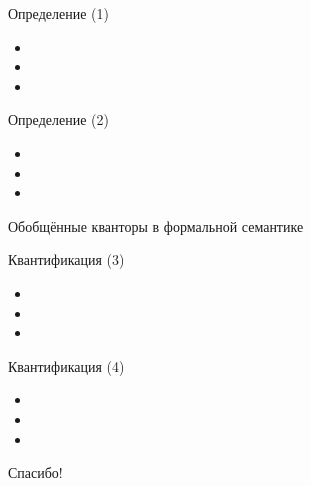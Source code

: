 \documentclass{beamer}
\begin{document}
\begin{frame}{Определение (1)}
\begin{itemize}
	\item 
	\item 
	\item 
\end{itemize}
\end{frame}

\begin{frame}{Определение (2)}
\begin{itemize}
	\item 
	\item 
	\item 
\end{itemize}
\end{frame}

\begin{frame}{}
\begin{center}
Обобщённые кванторы в формальной семантике
\end{center}
\end{frame}

\begin{frame}{Квантификация (3)}
\begin{itemize}
	\item 
	\item 
	\item 
\end{itemize}
\end{frame}

\begin{frame}{Квантификация (4)}
\begin{itemize}
	\item 
	\item 
	\item 
\end{itemize}
\end{frame}



\begin{frame}{}
    \thispagestyle{empty}
    \begin{center}
        {\large Спасибо!}
    \end{center}
\end{frame}
\end{document}
